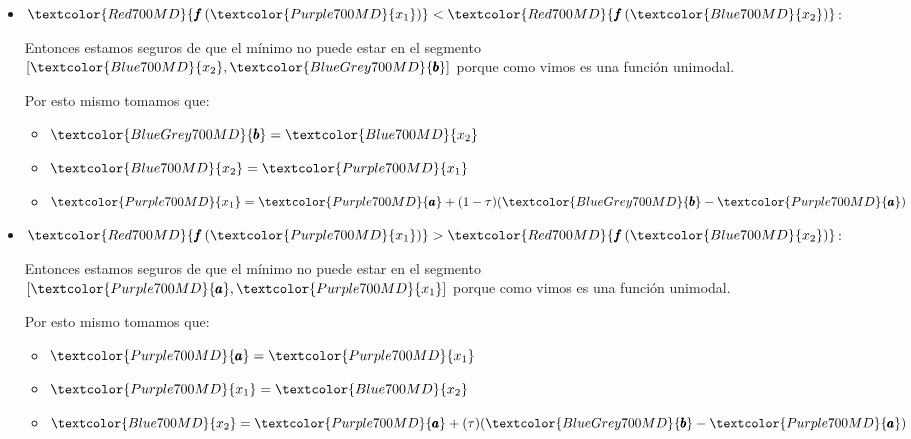 \documentclass[12pt, fleqn]{report}                             %
\newcommand \ForceColumnBreak   {\vfill\null\columnbreak}       %
\theoremstyle{break}                                            %
\newcommand{\Wrap}[1]           {\left( #1 \right)}             %
\newcommand{\Color}[2]{\textcolor{#1}{#2}}                      %
\newcommand \ColorFun          {Red700MD}                       %
\newcommand \ColorVarA         {Purple700MD}                    %
\newcommand \ColorVarB         {BlueGrey700MD}                  %
\newcommand \ColorVarXOne      {Purple700MD}                    %
\newcommand \ColorVarXTwo      {Blue700MD}                      %
\newcommand \Fun[1]      {\Color{\ColorFun}{\pmb{f}\Wrap{#1}}}          %
\newcommand \VarA        {\Color{\ColorVarA}{\pmb{a} }}                 %
\newcommand \VarB        {\Color{\ColorVarB}{\pmb{b} }}                 %
\newcommand \VarXOne     {\Color{\ColorVarXOne}{x_{1}  }}               %
\newcommand \VarXTwo     {\Color{\ColorVarXTwo}{x_{2}  }}               %
\begin{document}
            \begin{multicols*}{2}
                \begin{itemize}
                    \item $\Fun{\VarXOne} < \Fun{\VarXTwo}$:

                        Entonces estamos seguros de que el mínimo no puede estar en el segmento 
                        $[\VarXTwo, \VarB]$ porque como vimos es una función unimodal.

                        Por esto mismo tomamos que:
                        \begin{itemize}
                            \item $\VarB = \VarXTwo$
                            \item $\VarXTwo = \VarXOne$
                            \item $\VarXOne = \VarA + (1-\tau)(\VarB - \VarA)$
                        \end{itemize}

                    \ForceColumnBreak

                    \item $\Fun{\VarXOne} > \Fun{\VarXTwo}$:

                    Entonces estamos seguros de que el mínimo no puede estar en el segmento 
                    $[\VarA, \VarXOne]$ porque como vimos es una función unimodal.

                    Por esto mismo tomamos que:
                        \begin{itemize}
                            \item $\VarA = \VarXOne$
                            \item $\VarXOne = \VarXTwo$
                            \item $\VarXTwo = \VarA + (\tau)(\VarB - \VarA)$
                        \end{itemize}

                \end{itemize}
            \end{multicols*}
            
\end{document}
